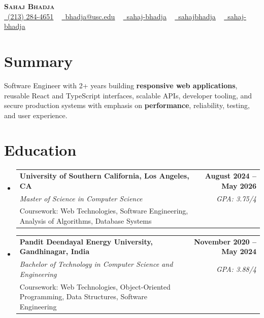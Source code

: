 \documentclass[letterpaper,10pt]{article}
\makeatletter
\newcommand{\sectionGap}{\vspace{-8pt}}
\newcommand{\resumeEduSubheading}[5]{\vspace{-1pt}\item\begin{tabular*}{1.0\textwidth}[t]{l@{\extracolsep{\fill}}r}\textbf{#1} & \textbf{\small #2} \\\textit{\small #3} & \textit{\small #4} \\\small #5 & \\\end{tabular*}\vspace{-4pt}}
\newcommand{\resumeSubHeadingListStart}{\begin{itemize}[leftmargin=0.0in, label={}]}
\newcommand{\resumeSubHeadingListEnd}{\end{itemize}}
\makeatother
\begin{document}
\begin{center}
{\Huge \scshape \textbf{Sahaj Bhadja}} \\ \vspace{1pt}
\small \href{tel:2132844651}{\faPhone\ \underline{(213) 284-4651}} ~ \href{mailto:bhadja@usc.edu}{\raisebox{-0.2\height}\faEnvelope\ \underline{bhadja@usc.edu}} ~
\href{https://www.linkedin.com/in/sahaj-bhadja/}{\raisebox{-0.2\height}\faLinkedin\ \underline{sahaj-bhadja}} ~ \href{https://github.com/SAHAJ-BHADJA}{\raisebox{-0.2\height}\faGithub\ \underline{sahajbhadja}} ~
\href{https://sahaj-bhadja.vercel.app/}{\raisebox{-0.2\height}\faGlobe\ \underline{sahaj-bhadja}}
\end{center}
\vspace{-16pt}
\section{Summary}
\begin{itemize}[leftmargin=0.15in, label={}]
\small{\item{Software Engineer with 2+ years building \textbf{responsive web applications}, reusable React and TypeScript interfaces, scalable APIs, developer tooling, and secure production systems with emphasis on \textbf{performance}, reliability, testing, and user experience.}}
\end{itemize}
\sectionGap
\section{Education}
\resumeSubHeadingListStart
\resumeEduSubheading{University of Southern California, Los Angeles, CA}{August 2024 -- May 2026}{Master of Science in Computer Science}{GPA: 3.75/4}{Coursework: Web Technologies, Software Engineering, Analysis of Algorithms, Database Systems}
\resumeEduSubheading{Pandit Deendayal Energy University, Gandhinagar, India}{November 2020 -- May 2024}{Bachelor of Technology in Computer Science and Engineering}{GPA: 3.88/4}{Coursework: Web Technologies, Object-Oriented Programming, Data Structures, Software Engineering}
\resumeSubHeadingListEnd
\sectionGap
\end{document}
